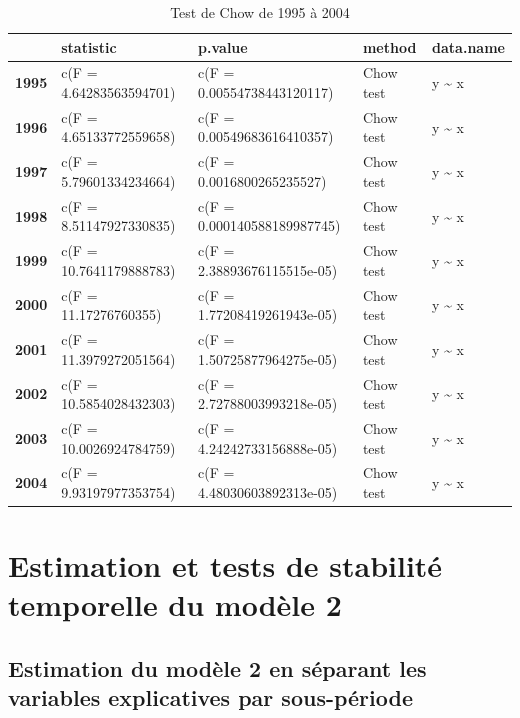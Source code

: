 \documentclass[
]{article}
\begin{document}
\begin{table}[!h]

\caption{\label{tab:unnamed-chunk-9}Test de Chow de 1995 à 2004}
\centering
\fontsize{7}{9}\selectfont
\begin{tabu} to 
\toprule
\textbf{} & \textbf{statistic} & \textbf{p.value} & \textbf{method} & \textbf{data.name}\\
\midrule
\textbf{1995} & c(F = 4.64283563594701) & c(F = 0.00554738443120117) & Chow test & y \textasciitilde{} x\\
\textbf{1996} & c(F = 4.65133772559658) & c(F = 0.00549683616410357) & Chow test & y \textasciitilde{} x\\
\textbf{1997} & c(F = 5.79601334234664) & c(F = 0.0016800265235527) & Chow test & y \textasciitilde{} x\\
\textbf{1998} & c(F = 8.51147927330835) & c(F = 0.000140588189987745) & Chow test & y \textasciitilde{} x\\
\textbf{1999} & c(F = 10.7641179888783) & c(F = 2.38893676115515e-05) & Chow test & y \textasciitilde{} x\\
\textbf{2000} & c(F = 11.17276760355) & c(F = 1.77208419261943e-05) & Chow test & y \textasciitilde{} x\\
\textbf{2001} & c(F = 11.3979272051564) & c(F = 1.50725877964275e-05) & Chow test & y \textasciitilde{} x\\
\textbf{2002} & c(F = 10.5854028432303) & c(F = 2.72788003993218e-05) & Chow test & y \textasciitilde{} x\\
\textbf{2003} & c(F = 10.0026924784759) & c(F = 4.24242733156888e-05) & Chow test & y \textasciitilde{} x\\
\textbf{2004} & c(F = 9.93197977353754) & c(F = 4.48030603892313e-05) & Chow test & y \textasciitilde{} x\\
\bottomrule
\end{tabu}
\end{table}

\hypertarget{estimation-et-tests-de-stabilituxe9-temporelle-du-moduxe8le-2}{%
\section{Estimation et tests de stabilité temporelle du modèle
2}\label{estimation-et-tests-de-stabilituxe9-temporelle-du-moduxe8le-2}}

\hypertarget{estimation-du-moduxe8le-2-en-suxe9parant-les-variables-explicatives-par-sous-puxe9riode}{%
\subsection{Estimation du modèle 2 en séparant les variables
explicatives par
sous-période}\label{estimation-du-moduxe8le-2-en-suxe9parant-les-variables-explicatives-par-sous-puxe9riode}}
\end{document}
